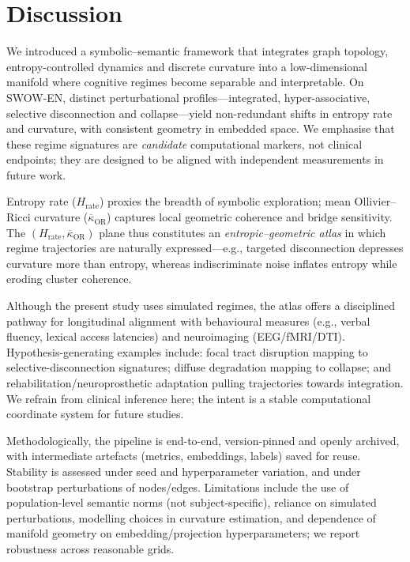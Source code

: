 \documentclass[fleqn,10pt]{wlscirep}
\begin{document}
\section*{Discussion}
We introduced a symbolic--semantic framework that integrates graph topology, entropy-controlled dynamics and discrete curvature into a low-dimensional manifold where cognitive regimes become separable and interpretable. On SWOW-EN, distinct perturbational profiles---integrated, hyper-associative, selective disconnection and collapse---yield non-redundant shifts in entropy rate and curvature, with consistent geometry in embedded space. We emphasise that these regime signatures are \emph{candidate} computational markers, not clinical endpoints; they are designed to be aligned with independent measurements in future work.

Entropy rate ($H_{\mathrm{rate}}$) proxies the breadth of symbolic exploration; mean Ollivier--Ricci curvature ($\overline{\kappa}_{\mathrm{OR}}$) captures local geometric coherence and bridge sensitivity. The $(H_{\mathrm{rate}},\overline{\kappa}_{\mathrm{OR}})$ plane thus constitutes an \emph{entropic--geometric atlas} in which regime trajectories are naturally expressed---e.g., targeted disconnection depresses curvature more than entropy, whereas indiscriminate noise inflates entropy while eroding cluster coherence.

Although the present study uses simulated regimes, the atlas offers a disciplined pathway for longitudinal alignment with behavioural measures (e.g., verbal fluency, lexical access latencies) and neuroimaging (EEG/fMRI/DTI). Hypothesis-generating examples include: focal tract disruption mapping to selective-disconnection signatures; diffuse degradation mapping to collapse; and rehabilitation/neuroprosthetic adaptation pulling trajectories towards integration. We refrain from clinical inference here; the intent is a stable computational coordinate system for future studies.

Methodologically, the pipeline is end-to-end, version-pinned and openly archived, with intermediate artefacts (metrics, embeddings, labels) saved for reuse. Stability is assessed under seed and hyperparameter variation, and under bootstrap perturbations of nodes/edges. Limitations include the use of population-level semantic norms (not subject-specific), reliance on simulated perturbations, modelling choices in curvature estimation, and dependence of manifold geometry on embedding/projection hyperparameters; we report robustness across reasonable grids.
\end{document}
